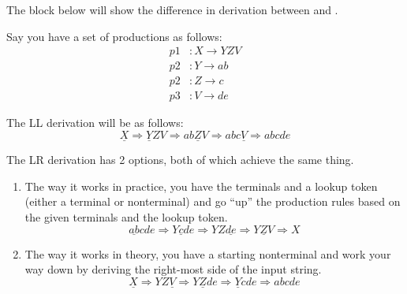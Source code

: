 The block below will show the difference in derivation between  and .
\begin{blackbox}
  Say you have a set of productions as follows:
  \begin{align*}
    p1&: X \rightarrow YZV \\
    p2&: Y \rightarrow ab \\
    p2&: Z \rightarrow c \\
    p3&: V \rightarrow de
  \end{align*}

  The LL derivation will be as follows:
  \begin{equation*}
    \underline{X} \Rightarrow \underline{Y}ZV \Rightarrow ab\underline{Z}V \Rightarrow abc\underline{V} \Rightarrow abcde
  \end{equation*}

  The LR derivation has 2 options, both of which achieve the same thing.
  \begin{enumerate}[noitemsep]
  \item The way it works in practice, you have the terminals and a lookup token (either a terminal or nonterminal) and go ``up'' the production rules based on the given terminals and the lookup token.
    \begin{equation*}
      \underline{ab}cde \Rightarrow Y\underline{c}de \Rightarrow YZ\underline{de} \Rightarrow \underline{YZV} \Rightarrow X
    \end{equation*}
  \item The way it works in theory, you have a starting nonterminal and work your way down by deriving the right-most side of the input string.
    \begin{equation*}
      \underline{X} \Rightarrow YZ\underline{V} \Rightarrow Y\underline{Z}de \Rightarrow \underline{Y}cde \Rightarrow abcde
    \end{equation*}
  \end{enumerate}
\end{blackbox}

